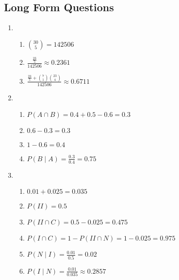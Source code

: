 \documentclass[12pt, a4paper]{article}
\begin{document}
\subsection*{Long Form Questions}
\begin{enumerate}[Q\arabic*.]
  \item 
    \begin{enumerate}[(\roman*)]
      \item $\displaystyle\binom{30}5 = 142506$

      \item $\displaystyle\frac{\frac{23}{5}}{142506} \approx 0.2361$

      \item $\displaystyle\frac{\frac{23}{5} + \binom 71\binom {23}4}{142506} \approx 0.6711$
    \end{enumerate}

  \item 
    \begin{enumerate}[(\roman*)]
      \item $P(A\cap B) = 0.4 + 0.5 - 0.6= 0.3$

      \item $0.6 - 0.3 = 0.3$

      \item $1 - 0.6 = 0.4$

      \item $P(B \mid A) = \frac{0.3}{0.4} = 0.75$
    \end{enumerate}

  \item 
    \begin{enumerate}[(\roman*)]
      \item $0.01 + 0.025 = 0.035$ 

      \item $P(II) = 0.5$

      \item $P(II \cap C) = 0.5 - 0.025 = 0.475$

      \item $P(I \cap C) = 1 - P(II \cap N) = 1 - 0.025 = 0.975$

      \item $P(N \mid I)  = \frac{0.01}{0.5} = 0.02$

      \item $P(I \mid N) = \frac{0.01}{0.035} \approx 0.2857$
    \end{enumerate}
\end{enumerate}
\end{document}
